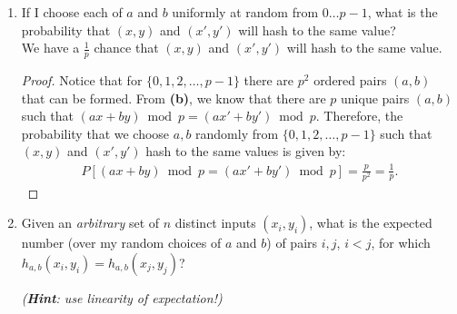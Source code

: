 \documentclass[11pt]{article}
\begin{document}
\begin{enumerate}
\begin{enumerate}
\begin{proof}
\begin{enumerate}
Let $x-x'=q$ and $y-y'=r$.  In this case, we have:
\begin{align*}
a(x-x')+b(y-y') =& \\
a(q)+b(r)=& 0 \bmod p
\end{align*}
By the hint in \textbf{(a)}, we know that because $q,r \neq 0$ are fixed, the equation $aq = z\bmod p$ has exactly one solution for every element $z\in \mathbb{Z}_p$.  Similarly, for every $z \in \mathbb{Z}_p$, there exists exactly one $-z \in \mathbb{Z}_p$ such that $-z + z =0$.  Therefore, as $a$ is allowed to vary, over the entire set, $b$ must be chosen uniquely such that $aq+br = 0 \bmod p$ holds.  Because there are $p$ possible choices for $a$ (i.e. every element in $\mathbb{Z}_p$), there are $p$ unique combinations $(a,b)$ such that $(ax+by) \bmod p = (ax'+by') \bmod p$. 
\end{enumerate}
\end{proof}
\item
If I choose each of $a$ and $b$ uniformly at random from $0 \ldots p-1$,
what is the probability that $(x,y)$ and $(x',y')$ will hash to the same value?  
\\
We have a $\frac{1}{p}$ chance that $(x,y)$ and $(x',y')$ will hash to the same value.
\begin{proof}
Notice that for $\{0,1,2,\ldots,p-1\}$ there are $p^2$ ordered pairs $(a,b)$ that can be formed.  From \textbf{(b)}, we know that there are $p$ unique pairs $(a,b)$ such that $(ax+by)\bmod p = (ax'+by') \bmod p$.  Therefore, the probability that we choose $a,b$ randomly from $\{0,1,2,\ldots,p-1\}$ such that $(x,y)$ and $(x',y')$ hash to the same values is given by:
\begin{align*}
P[(ax+by)\bmod p = (ax'+by')\bmod p] = \frac{p}{p^2} = \frac{1}{p}.
\end{align*}
\end{proof}
\item
Given an \emph{arbitrary} set of $n$ distinct inputs $(x_i, y_i)$,
what is the expected number (over my random choices of $a$ and $b$)
of pairs $i, j$, $i < j$, for which $h_{a,b}(x_i, y_i) = h_{a,b}(x_j,y_j)$?

\textit{(\textbf{Hint}: use linearity of expectation!)}
\end{enumerate}
\end{enumerate}
\end{document}
